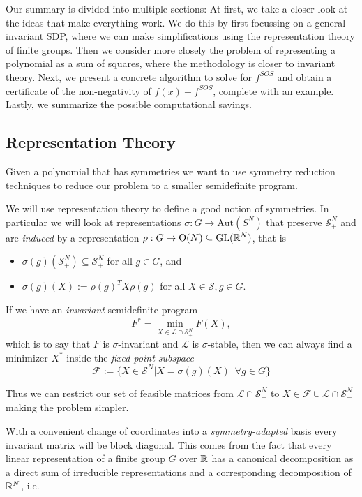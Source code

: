\documentclass[]{article}
\begin{document}
Our summary is divided into multiple sections: 
At first, we take a closer look at the ideas that make everything work. We do this by first focussing on a general invariant SDP, where we can make simplifications using the representation theory of finite groups. Then we consider more closely the problem of representing a polynomial as a sum of squares, where the methodology is closer to invariant theory.
Next, we present a concrete algorithm to solve for $f^{SOS}$ and obtain a certificate of the non-negativity of $f(x)-f^{SOS}$, complete with an example. Lastly, we summarize the possible computational savings.\\%

\subsection*{Representation Theory}

Given a polynomial that has symmetries we want to use symmetry reduction techniques to reduce our problem to a smaller semidefinite program.

We will use representation theory to define a good notion of symmetries. In particular we will look at representations
$\sigma:G\rightarrow \mathrm{Aut}(S^N)$ that preserve $\mathcal{S}_+^N$ and are \textit{induced} by a representation $\rho:G\rightarrow \mathrm{O}(N)\subseteq\mathrm{GL}(\mathbb R^N)$, 
that is 
\begin{itemize}
    \item $\sigma(g)(\mathcal{S}_+^N)\subseteq \mathcal{S}_+^N$ for all $g\in G$, and
    \item $\sigma(g)(X) := \rho(g)^TX\rho(g)$ for all $X\in \mathcal{S} , g\in G.$
\end{itemize}

If we have an \textit{invariant} semidefinite program 
\[
    F^\ast=\min_{X\in\mathcal{L}\cap\mathcal{S}_+^N}F(X),
\]
which is to say that $F$ is $\sigma$-invariant and $\mathcal{L}$ is $\sigma$-stable, then we can always find a minimizer $X^\ast$ inside the \textit{fixed-point subspace} 
\[
    \mathcal{F} := \{X\in\mathcal{S}^N | X= \sigma(g)(X)\,\,\, \forall g \in G\}
\]

Thus we can restrict our set of feasible matrices from $\mathcal{L}\cap \mathcal{S}_+^N$ to $ X\in\mathcal{F}\cup\mathcal{L}\cap \mathcal{S}_+^N$ making the problem simpler.

With a convenient change of coordinates into a \textit{symmetry-adapted} basis every invariant matrix will be block diagonal. This comes from the fact that every linear representation of a finite group $G$ over $\mathbb R$ has a canonical decomposition as a direct sum of irreducible representations and a corresponding decomposition of $\mathbb R^N$, i.e.
\end{document}
